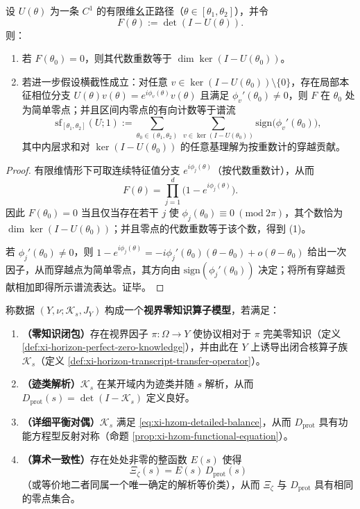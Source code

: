 \begin{theorem}\label{thm:xi-unitary-slice-zero-count-spectral-flow}
设 \(U(\theta)\) 为一条 \(C^{1}\) 的有限维幺正路径（\(\theta\in[\theta_1,\theta_2]\)），并令
\[
F(\theta):=\det(I-U(\theta)).
\]
则：
\begin{enumerate}
  \item 若 \(F(\theta_0)=0\)，则其代数重数等于 \(\dim\ker(I-U(\theta_0))\)。
  \item 若进一步假设横截性成立：对任意 \(v\in\ker(I-U(\theta_0))\setminus\{0\}\)，存在局部本征相位分支 \(U(\theta)v(\theta)=e^{i\phi_v(\theta)}v(\theta)\) 且满足 \(\phi_v'(\theta_0)\neq 0\)，则 \(F\) 在 \(\theta_0\) 处为简单零点；并且区间内零点的有向计数等于谱流
  \[
  \mathrm{sf}_{[\theta_1,\theta_2]}(U;1)
  :=
  \sum_{\theta_0\in(\theta_1,\theta_2)}\ \sum_{v\in\ker(I-U(\theta_0))}\mathrm{sign}\bigl(\phi_v'(\theta_0)\bigr),
  \]
  其中内层求和对 \(\ker(I-U(\theta_0))\) 的任意基理解为按重数计的穿越贡献。
\end{enumerate}
\end{theorem}

\begin{proof}
有限维情形下可取连续特征值分支 \(e^{i\phi_j(\theta)}\)（按代数重数计），从而
\[
F(\theta)=\prod_{j=1}^{d}\bigl(1-e^{i\phi_j(\theta)}\bigr).
\]
因此 \(F(\theta_0)=0\) 当且仅当存在若干 \(j\) 使 \(\phi_j(\theta_0)\equiv 0\ (\mathrm{mod}\ 2\pi)\)，其个数恰为 \(\dim\ker(I-U(\theta_0))\)；并且零点的代数重数等于该个数，得到 (1)。
\par
若 \(\phi_j'(\theta_0)\neq 0\)，则
\(
1-e^{i\phi_j(\theta)}=-i\phi_j'(\theta_0)(\theta-\theta_0)+o(\theta-\theta_0)
\)
给出一次因子，从而穿越点为简单零点，其方向由 \(\mathrm{sign}(\phi_j'(\theta_0))\) 决定；将所有穿越贡献相加即得所示谱流表达。证毕。
\end{proof}

\begin{definition}\label{def:xi-hzom}
称数据 \((Y,\nu;\mathcal{K}_s,J_Y)\) 构成一个\textbf{视界零知识算子模型}，若满足：
\begin{enumerate}
  \item \textbf{（零知识闭包）}存在视界因子 \(\pi:\Omega\to Y\) 使协议相对于 \(\pi\) 完美零知识（定义 \ref{def:xi-horizon-perfect-zero-knowledge}），并由此在 \(Y\) 上诱导出闭合核算子族 \(\mathcal{K}_s\)（定义 \ref{def:xi-horizon-transcript-transfer-operator}）。
  \item \textbf{（迹类解析）}\(\mathcal{K}_s\) 在某开域内为迹类并随 \(s\) 解析，从而 \(D_{\mathrm{prot}}(s)=\det(I-\mathcal{K}_s)\) 定义良好。
  \item \textbf{（详细平衡对偶）}\(\mathcal{K}_s\) 满足 \eqref{eq:xi-hzom-detailed-balance}，从而 \(D_{\mathrm{prot}}\) 具有功能方程型反射对称（命题 \ref{prop:xi-hzom-functional-equation}）。
  \item \textbf{（算术一致性）}存在处处非零的整函数 \(E(s)\) 使得
  \[
  \Xi_{\zeta}(s)=E(s)\,D_{\mathrm{prot}}(s)
  \]
  （或等价地二者同属一个唯一确定的解析等价类），从而 \(\Xi_{\zeta}\) 与 \(D_{\mathrm{prot}}\) 具有相同的零点集合。
\end{enumerate}
\end{definition}

